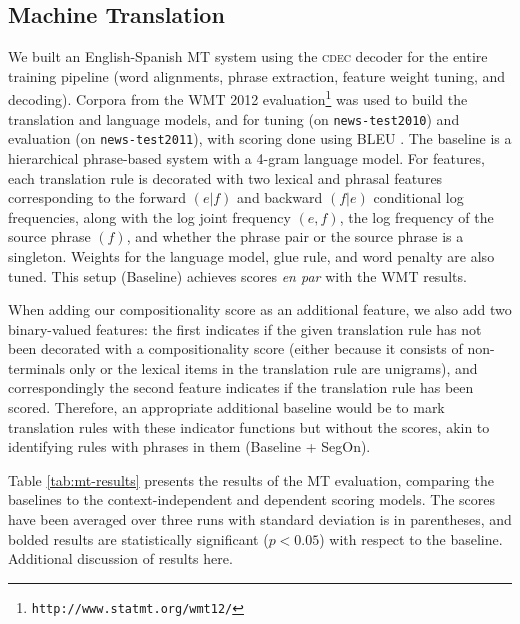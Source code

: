 \documentclass[11pt,letterpaper]{article}
\begin{document}
\subsection{Machine Translation}
\label{sec:mt-eval}

We built an English-Spanish MT system using the \textsc{cdec} decoder \cite{Dyer2010} for the entire training pipeline (word alignments, phrase extraction, feature weight tuning, and decoding).
Corpora from the WMT 2012 evaluation\footnote{\texttt{http://www.statmt.org/wmt12/}} was used to build the translation and language models, and for tuning (on \texttt{news-test2010}) and evaluation (on \texttt{news-test2011}), with scoring done using BLEU \cite{Papineni2002}. 
The baseline is a hierarchical phrase-based system \cite{Chiang2007} with a 4-gram language model. 
For features, each translation rule is decorated with two lexical and phrasal features corresponding to the forward $(e|f)$ and backward $(f|e)$ conditional log frequencies, along with the log joint frequency $(e,f)$, the log frequency of the source phrase $(f)$, and whether the phrase pair or the source phrase is a singleton. 
Weights for the language model, glue rule, and word penalty are also tuned. 
This setup (Baseline) achieves scores \emph{en par} with the WMT results. 

When adding our compositionality score as an additional feature, we also add two binary-valued features: the first indicates if the given translation rule has not been decorated with a compositionality score (either because it consists of non-terminals only or the lexical items in the translation rule are unigrams), and correspondingly the second feature indicates if the translation rule has been scored. 
Therefore, an appropriate additional baseline would be to mark translation rules with these indicator functions but without the scores, akin to identifying rules with phrases in them (Baseline + SegOn). 

Table \ref{tab:mt-results} presents the results of the MT evaluation, comparing the baselines to the context-independent and dependent scoring models. 
The scores have been averaged over three runs with standard deviation is in parentheses, and bolded results are statistically significant ($p < 0.05$) with respect to the baseline. 
Additional discussion of results here. 
\end{document}
